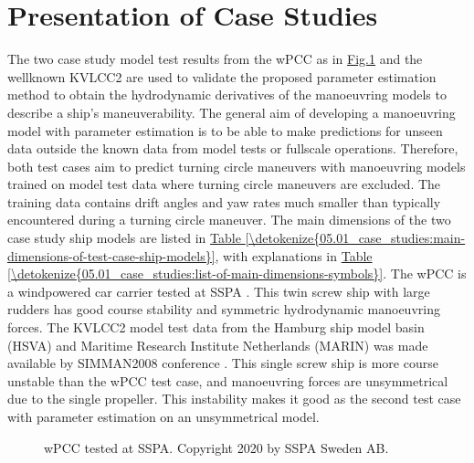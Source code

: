 \documentclass[review]{elsarticle}
\let\sphinxpxdimen\pdfpxdimen\else\newdimen\sphinxpxdimen
\begin{document}
\section{Presentation of Case Studies}
\label{\detokenize{05.01_case_studies:presentation-of-case-studies}}\label{\detokenize{05.01_case_studies:case-studies}}\label{\detokenize{05.01_case_studies::doc}}
\sphinxAtStartPar
The two case study model test results from the wPCC as in \hyperref[\detokenize{05.01_case_studies:wpcc-mdl}]{Fig.\@ \ref{\detokenize{05.01_case_studies:wpcc-mdl}}} and the well\sphinxhyphen{}known KVLCC2 are used to validate the proposed parameter estimation method to obtain the hydrodynamic derivatives of the manoeuvring models to describe a ship’s maneuverability. The general aim of developing a manoeuvring model with parameter estimation is to be able to make predictions for unseen data outside the known data from model tests or full\sphinxhyphen{}scale operations. Therefore, both test cases aim to predict turning circle maneuvers with manoeuvring models trained on model test data where turning circle maneuvers are excluded. The training data contains drift angles and yaw rates much smaller than typically encountered during a turning circle maneuver.
The main dimensions of the two case study ship models are listed in \hyperref[\detokenize{05.01_case_studies:main-dimensions-of-test-case-ship-models}]{Table \ref{\detokenize{05.01_case_studies:main-dimensions-of-test-case-ship-models}}}, with explanations in \hyperref[\detokenize{05.01_case_studies:list-of-main-dimensions-symbols}]{Table \ref{\detokenize{05.01_case_studies:list-of-main-dimensions-symbols}}}. The wPCC is a wind\sphinxhyphen{}powered car carrier tested at SSPA \cite{alexandersson_wpcc_2022}. This twin screw ship with large rudders has good course stability and symmetric hydrodynamic manoeuvring forces. The KVLCC2 model test data from the Hamburg ship model basin (HSVA) and Maritime Research Institute Netherlands (MARIN) was made available by SIMMAN2008 conference \cite{stern_experience_2011}. This single screw ship is more course unstable than the wPCC test case, and manoeuvring forces are unsymmetrical due to the single propeller. This instability makes it good as the second test case with parameter estimation on an unsymmetrical model.

\begin{figure}[H]
\centering
\capstart

\noindent\sphinxincludegraphics[height=150\sphinxpxdimen]{{wpcc_mdl}.png}
\caption{wPCC tested at SSPA. Copyright 2020 by SSPA Sweden AB.}\label{\detokenize{05.01_case_studies:wpcc-mdl}}\end{figure}
\end{document}
